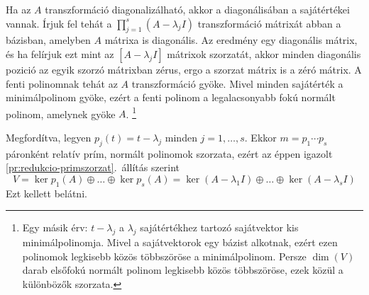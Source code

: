 \documentclass[9pt, a4paper, showtrims]{memoir}
\makeatletter
\renewenvironment{proof}[1][\proofname]
    {\par\pushQED{\qed}%
    \normalfont \topsep6\p@\@plus6\p@\relax
    \trivlist
    \item[\hskip\labelsep
        \itshape
    #1\@addpunct{:}]\ignorespaces}
    {\popQED\endtrivlist\@endpefalse}
\theoremstyle{plain}
\theoremstyle{remark}
\theoremstyle{definition}
\makeatother
\begin{document}
\begin{proof}
	Ha az $A$ transzformáció diagonalizálható,
	akkor a diagonálisában a sajátértékei vannak.
	Írjuk fel tehát a
	\begin{math}
		\prod_{j=1}^s\left( A-\lambda_j I \right)
	\end{math}
	transzformáció mátrixát abban a bázisban,
	amelyben $A$ mátrixa is diagonális.
	Az eredmény egy diagonális mátrix,
	és ha felírjuk ezt mint az $[A-\lambda_j I]$ mátrixok szorzatát,
	akkor minden diagonális pozició az egyik szorzó mátrixban zérus,
	ergo a szorzat mátrix is a zéró mátrix.
	A fenti polinomnak tehát az $A$ transzformáció gyöke.
	Mivel minden sajátérték a minimálpolinom gyöke,
	ezért a fenti polinom a legalacsonyabb fokú normált polinom,
	amelynek gyöke $A$.
	\footnote{
		Egy másik érv: $t-\lambda_j$ a $\lambda_j$ sajátértékhez tartozó sajátvektor kis minimálpolinomja.
		Mivel a sajátvektorok egy bázist alkotnak,
		ezért ezen polinomok legkisebb közös többszöröse a minimálpolinom.
		Persze $\dim(V)$ darab elsőfokú normált polinom legkisebb közös többszöröse,
		ezek közül a különbözők szorzata.
	}

	Megfordítva,
	legyen $p_j\left( t \right)=t-\lambda_j$ minden $j=1,\ldots,s.$
	Ekkor $m=p_1\cdots p_s$ páronként relatív prím, normált polinomok szorzata,
	ezért az éppen igazolt \ref{pr:redukcio-primszorzat}.~állítás szerint
	\begin{equation*}
		V=
		\ker p_1\left( A \right)\oplus\dots\oplus\ker p_s\left( A \right)
		=
		\ker\left( A-\lambda_1 I \right)\oplus\dots\oplus\ker\left( A-\lambda_s I \right)
	\end{equation*}
	Ezt kellett belátni.
\end{proof}
\end{document}
